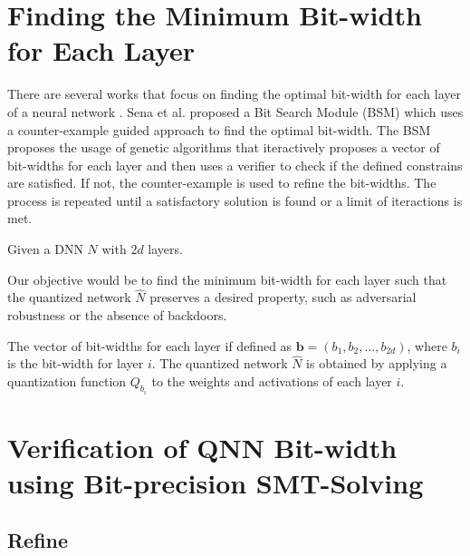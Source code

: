 \section{Finding the Minimum Bit-width for Each Layer}\label{sec:bit_width}
There are several works that focus on finding the optimal bit-width for each layer of a neural network \cite{sena2021verifying}. Sena et al. proposed a Bit Search Module (BSM) which uses a counter-example guided approach to find the optimal bit-width. The BSM proposes the usage of genetic algorithms that iteractively proposes a vector of bit-widths for each layer and then uses a verifier to check if the defined constrains are satisfied. If not, the counter-example is used to refine the bit-widths. The process is repeated until a satisfactory solution is found or a limit of iteractions is met.



Given a DNN $N$ with $2d$ layers. 

Our objective would be to find the minimum bit-width for each layer such that the quantized  network $\hat{N}$ preserves a desired property, such as adversarial robustness or the absence of backdoors.

The vector of bit-widths for each layer if defined as $\mathbf{b} = (b_1, b_2, \ldots, b_{2d})$, where $b_i$ is the bit-width for layer $i$. The quantized network $\hat{N}$ is obtained by applying a quantization function $Q_{b_i}$ to the weights and activations of each layer $i$.



\section{Verification of QNN Bit-width using Bit-precision SMT-Solving}\label{sec:verificacao}




\subsection{Refine}

